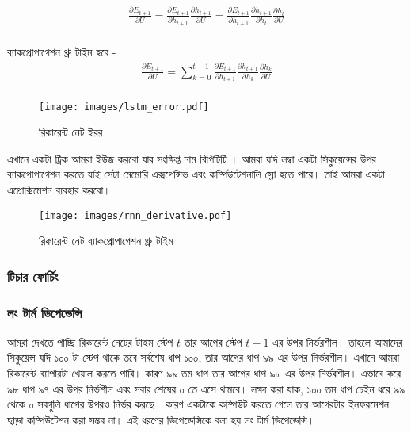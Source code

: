 \documentclass{book}
\begin{document}
\begin{align} %
   \frac {\partial E_{t+1}} {\partial U} = \frac {\partial E_{t+1}} { \partial h_{t+1}} \frac {\partial h_{t+1}} { \partial U} = \frac {\partial E_{t+1}} { \partial h_{t+1}} \frac {\partial h_{t+1}} { \partial h_t} \frac {\partial h_t} { \partial U}\\
\end{align} 

ব্যাকপ্রোপাগেশন থ্রু টাইম হবে - 
\begin{align} %
   \frac {\partial E_{t+1}} {\partial U} = \sum _{k=0} ^{t+1} \frac {\partial E_{t+1}} { \partial h_{t+1}} \frac {\partial h_{t+1}} { \partial h_k} \frac {\partial h_k} { \partial U} \\
\end{align}



\begin{figure}[htbp] %
   \centering
   \texttt{[image: images/lstm\_error.pdf]} 
   \caption{রিকারেন্ট নেট ইরর}
   \label{fig:rnn_error}
\end{figure} 


এখানে একটা ট্রিক আমরা ইউজ করবো যার সংক্ষিপ্ত নাম বিপিটিটি \cite{58337}। আমরা যদি লম্বা একটা সিকুয়েন্সের উপর ব্যাকপোপাগেশন করতে যাই সেটা মেমোরি এক্সপেন্সিভ এবং কম্পিউটেশনালি স্লো হতে পারে।
তাই আমরা একটা এপ্রোক্সিমেশন ব্যবহার করবো। 


\begin{figure}[htbp] %
   \centering
   \texttt{[image: images/rnn\_derivative.pdf]} 
   \caption{রিকারেন্ট নেট ব্যাকপ্রোপাগেশন থ্রু টাইম}
   \label{fig:rnn_derivative}
\end{figure} 

\subsubsection{টিচার ফোর্চিং}
\subsubsection{লং টার্ম ডিপেন্ডেন্সি}
আমরা দেখতে পাচ্ছি রিকারেন্ট নেটের টাইম স্টেপ $t$ তার আগের স্টেপ $t-1$ এর উপর নির্ভরশীল। তাহলে আমাদের সিকুয়েন্স যদি ১০০ টা স্টেপ থাকে তবে সর্বশেষ ধাপ ১০০, তার আগের ধাপ 
৯৯ এর উপর নির্ভরশীল। এখানে আমরা রিকারেন্ট ব্যাপারটা খেয়াল করতে পারি। কারণ ৯৯ তম ধাপ তার আগের ধাপ ৯৮ এর উপর নির্ভরশীল। এভাবে করে ৯৮ ধাপ ৯৭ এর উপর নির্ভশীল এবং 
সবার শেষের ০ তে এসে থামবে। লক্ষ্য করা যাক, ১০০ তম ধাপ চেইন ধরে ৯৯ থেকে ০ সবগুলি ধাপের উপরও নির্ভর করছে। কারণ একটাকে কম্পিউট করতে গেলে তার আগেরটার ইনফরমেশন ছাড়া 
কম্পিউটেশন করা সম্ভব না। এই ধরণের ডিপেন্ডেন্সিকে বলা হয় লং টার্ম ডিপেন্ডেন্সি। 
\end{document}
